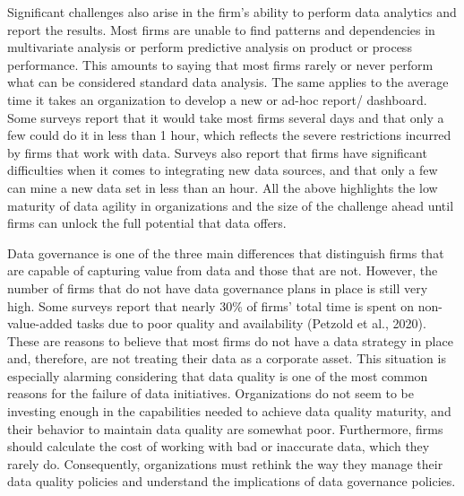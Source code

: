 \documentclass[
  letterpaper,
  DIV=11,
  numbers=noendperiod]{scrreprt}
\begin{document}
Significant challenges also arise in the firm's ability to perform data
analytics and report the results. Most firms are unable to find patterns
and dependencies in multivariate analysis or perform predictive analysis
on product or process performance. This amounts to saying that most
firms rarely or never perform what can be considered standard data
analysis. The same applies to the average time it takes an organization
to develop a new or ad-hoc report/ dashboard. Some surveys report that
it would take most firms several days and that only a few could do it in
less than 1 hour, which reflects the severe restrictions incurred by
firms that work with data. Surveys also report that firms have
significant difficulties when it comes to integrating new data sources,
and that only a few can mine a new data set in less than an hour. All
the above highlights the low maturity of data agility in organizations
and the size of the challenge ahead until firms can unlock the full
potential that data offers.

Data governance is one of the three main differences that distinguish
firms that are capable of capturing value from data and those that are
not. However, the number of firms that do not have data governance plans
in place is still very high. Some surveys report that nearly 30\% of
firms' total time is spent on non-value-added tasks due to poor quality
and availability (Petzold et al., 2020). These are reasons to believe
that most firms do not have a data strategy in place and, therefore, are
not treating their data as a corporate asset. This situation is
especially alarming considering that data quality is one of the most
common reasons for the failure of data initiatives. Organizations do not
seem to be investing enough in the capabilities needed to achieve data
quality maturity, and their behavior to maintain data quality are
somewhat poor. Furthermore, firms should calculate the cost of working
with bad or inaccurate data, which they rarely do. Consequently,
organizations must rethink the way they manage their data quality
policies and understand the implications of data governance policies.
\end{document}
